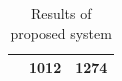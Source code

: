 \begin{table}[ht!]
\begin{tabular}{ | c | c | c | }
\begin{minipage}{.3\textwidth}
\begin{center}
      \end{center}
    \end{minipage}
    &
      1012
    & 
      1274
    \\ \hline
  \end{tabular}
  \caption{Results of proposed system}\label{tbl:myLboro}
\end{table}

\bigskip




